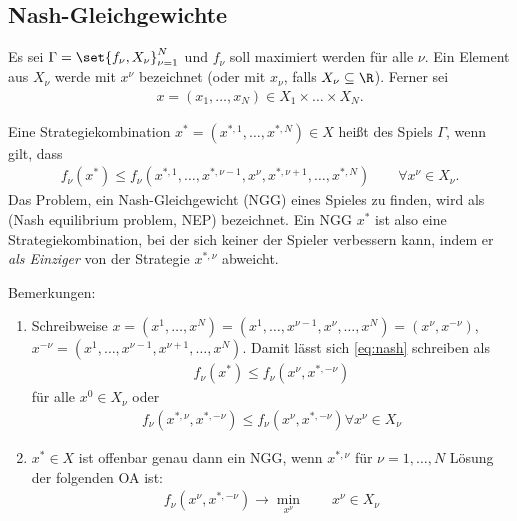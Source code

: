\subsection{Nash-Gleichgewichte}
Es sei $\Gamma = \set{f_{\nu}, X_{\nu}}_{\nu = 1}^{N}$ und $f_{\nu}$ soll maximiert werden für alle $\nu$. Ein Element aus $X_{\nu}$ werde mit $x^{\nu}$ bezeichnet (oder mit $x_{\nu}$, falls $X_{\nu} \subseteq \R$). Ferner sei
\begin{align*}
  x = (x_{1}, \dots, x_{N}) \in X_{1} \times \dots \times X_{N}.
\end{align*}
\begin{definition*}
  Eine Strategiekombination $x^{*} = (x^{*, 1}, \dots, x^{*, N}) \in X$ heißt  des Spiels $\Gamma$, wenn gilt, dass
  \begin{align}\label{eq:nash}
    f_{\nu}(x^{*}) \leq f_{\nu}(x^{*, 1}, \dots, x^{*, \nu-1}, x^{\nu}, x^{*, \nu+1}, \dots, x^{*, N}) \qquad \forall x^{\nu} \in X_{\nu}.
  \end{align}
Das Problem, ein Nash-Gleichgewicht (NGG) eines Spieles zu finden, wird als  (Nash equilibrium problem, NEP) bezeichnet. Ein NGG $x^{*}$ ist also eine Strategiekombination, bei der sich keiner der Spieler verbessern kann, indem er \emph{als Einziger} von der Strategie $x^{*, \nu}$ abweicht. 
\end{definition*}
Bemerkungen:
\begin{enumerate}
\item Schreibweise $x = (x^{1}, \dots, x^{N}) = (x^{1}, \dots, x^{\nu-1}, x^{\nu}, \dots, x^{N})= (x^\nu, x^{-\nu})$, $x^{-\nu} =(x^{1}, \dots, x^{\nu-1}, x^{\nu+1}, \dots, x^{N}) $. Damit lässt sich \eqref{eq:nash} schreiben als
  \begin{align*}
    f_{\nu}(x^{*})\leq f_{\nu}(x^{\nu}, x^{*, -\nu}) 
  \end{align*}
für alle $x^{0} \in X_{\nu}$ oder 
\begin{align*}
      f_{\nu}(x^{*, \nu}, x^{*, -\nu})\leq f_{\nu}(x^{\nu}, x^{*, -\nu}) \forall x^{\nu} \in X_{\nu} 
\end{align*}
\item $x^{*} \in X$ ist offenbar genau dann ein NGG, wenn $x^{*, \nu}$ für $\nu = 1, \dots, N$ Lösung der folgenden OA ist:
  \begin{align}\label{eq:ngg_equ}
    f_{\nu}(x^{\nu}, x^{*, -\nu}) \to \min_{x^{\nu}} \qquad x^{\nu} \in X_{\nu}
  \end{align}

\end{enumerate}

